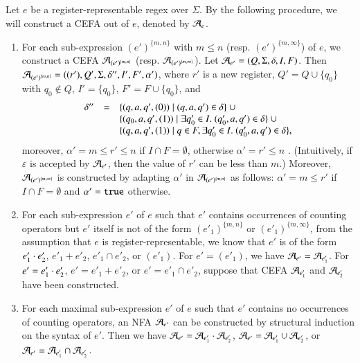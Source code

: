 Let $e$ be a register-representable regex over $\Sigma$. By the following procedure, we will construct a CEFA out of $e$, denoted by $\mathcal{A}_e$. 
\begin{enumerate}
%
\item For each sub-expression $(e')^{\{m,n\}}$ with $m \le n$ (resp. $(e')^{\{m, \infty\}}$) of $e$, we construct a CEFA $\mathcal{A}_{(e')^{\{m,n\}}}$ (resp. $\mathcal{A}_{(e')^{\{m, \infty\}}}$). Let $\mathcal{A}_{e'} = (Q, \Sigma, \delta, I, F)$.  
%
Then $\mathcal{A}_{(e')^{\{m,n\}}} = ((r'), Q', \Sigma, \delta'', I', F', \alpha')$, where $r'$ is a new register, $Q' = Q \cup \{q_0\}$ with $q_0 \not \in Q$, $I' = \{q_0\}$, $F'= F \cup \{q_0\}$, and 
%
$$
\begin{array}{l c l}
\delta'' & = & \{(q, a, q', (0)) \mid (q, a, q') \in \delta\}\  \cup \\
& & \{(q_0, a, q', (1))  \mid \exists q'_0 \in I.\ (q'_0, a, q') \in \delta\}\ \cup \\
& & \{(q, a, q', (1)) \mid q \in F, \exists q'_0 \in I.\ (q'_0, a, q') \in \delta\},
\end{array}
$$ 
%
moreover, $\alpha' = m \le r' \le n$ if $I \cap F = \emptyset$, otherwise $\alpha' = r' \le n$ .  (Intuitively, if $\varepsilon$ is accepted by $\mathcal{A}_{e'}$, then the value of $r'$ can be less than $m$.) Moreover, $\mathcal{A}_{(e')^{\{m, \infty\}}}$ is constructed by adapting $\alpha'$ in $\mathcal{A}_{(e')^{\{m,n\}}}$ as follows: $\alpha' = m \le r'$ if $I \cap F = \emptyset$ and $\alpha' = \mathtt{true}$ otherwise. 
%

\item For each sub-expression $e'$ of $e$ such that $e'$ contains occurrences of counting operators but $e'$ itself is not of the form $(e'_1)^{\{m,n\}}$ or $(e'_1)^{\{m,\infty\}}$, from the assumption that $e$ is register-representable, we know that $e'$ is of the form $e'_1 \cdot e'_2$, $e'_1 + e'_2$, $e'_1 \cap e'_2$, or $(e'_1)$. For $e' = (e'_1)$, we have $\mathcal{A}_{e'} = \mathcal{A}_{e'_1}$. For $e' = e'_1 \cdot e'_2$, $e' = e'_1 + e'_2$, or $e' = e'_1 \cap e'_2$, suppose that CEFA $\mathcal{A}_{e'_1}$ and $\mathcal{A}_{e'_2}$ have been constructed. 

\item For each maximal sub-expression $e'$ of $e$ such that $e'$ contains no occurrences of counting operators, an NFA $\mathcal{A}_{e'}$ can be constructed by structural induction on the syntax of $e'$. 
Then we have $\mathcal{A}_{e'} = \mathcal{A}_{e'_1} \cdot \mathcal{A}_{e'_2}$, $\mathcal{A}_{e'} = \mathcal{A}_{e'_1} \cup \mathcal{A}_{e'_2}$, or $\mathcal{A}_{e'} = \mathcal{A}_{e'_1} \cap \mathcal{A}_{e'_2}$. 
\end{enumerate}

